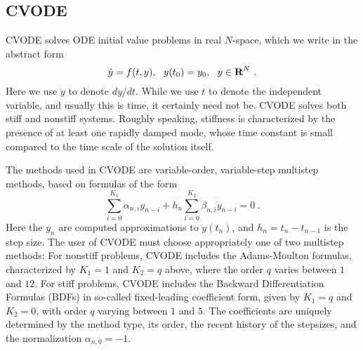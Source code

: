 \subsection{CVODE}

CVODE solves ODE initial value problems in real $N$-space, which we
write in the abstract form
\[ \dot{y} = f(t,y),~~ y(t_0) = y_0,~~ y \in \mbox{\bf R}^N ~. \]
Here we use $\dot{y}$ to denote $dy/dt$.  While we use $t$ to denote
the independent variable, and usually this is time, it certainly need
not be.  CVODE solves both stiff and nonstiff systems.  Roughly
speaking, stiffness is characterized by the presence of at least one
rapidly damped mode, whose time constant is small compared to the time
scale of the solution itself.

The methods used in CVODE are variable-order, variable-step multistep
methods, based on formulas of the form
\begin{equation}
 \sum_{i = 0}^{K_1} \alpha_{n,i} y_{n-i} + 
     h_n \sum_{i = 0}^{K_2} \beta_{n,i} \dot{y}_{n-i} = 0 ~.
\label{LMM}
\end{equation}
Here the $y_n$ are computed approximations to $y(t_n)$, and
$h_n = t_n - t_{n-1}$ is the step size.  The user of CVODE must choose
appropriately one of two multistep methods: For nonstiff problems,
CVODE includes the Adams-Moulton formulas, characterized by $K_1 = 1$
and $K_2 = q$ above, where the order $q$ varies between $1$ and $12$.
For stiff problems, CVODE includes the Backward Differentiation
Formulas (BDFs) in so-called fixed-leading coefficient form, given by
$K_1 = q$ and $K_2 = 0$, with order $q$ varying between $1$ and $5$.
The coefficients are uniquely determined by the method type, its
order, the recent history of the stepsizes, and the normalization
$\alpha_{n,0} = -1$.

